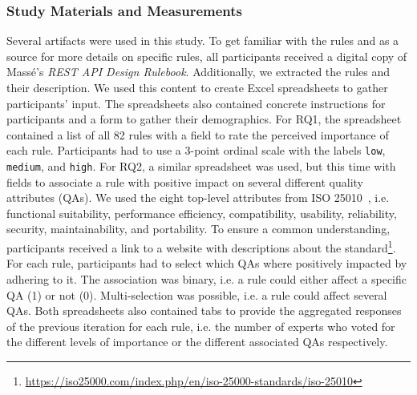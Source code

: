 \documentclass[runningheads]{llncs}
\begin{document}
\subsubsection{Study Materials and Measurements}
Several artifacts were used in this study.
To get familiar with the rules and as a source for more details on specific rules, all participants received a digital copy of Massé's \textit{REST API Design Rulebook}.
Additionally, we extracted the rules and their description.
We used this content to create Excel spreadsheets to gather participants' input.
The spreadsheets also contained concrete instructions for participants and a form to gather their demographics.
For RQ1, the spreadsheet contained a list of all 82 rules with a field to rate the perceived importance of each rule.
Participants had to use a 3-point ordinal scale with the labels \texttt{low}, \texttt{medium}, and \texttt{high}.
For RQ2, a similar spreadsheet was used, but this time with fields to associate a rule with positive impact on several different quality attributes (QAs).
We used the eight top-level attributes from ISO 25010~\cite{ISO25010}, i.e. functional suitability, performance efficiency, compatibility, usability, reliability, security, maintainability, and portability.
To ensure a common understanding, participants received a link to a website with descriptions about the standard\footnote{\url{https://iso25000.com/index.php/en/iso-25000-standards/iso-25010}}.
For each rule, participants had to select which QAs where positively impacted by adhering to it.
The association was binary, i.e. a rule could either affect a specific QA (1) or not (0).
Multi-selection was possible, i.e. a rule could affect several QAs.
Both spreadsheets also contained tabs to provide the aggregated responses of the previous iteration for each rule, i.e. the number of experts who voted for the different levels of importance or the different associated QAs respectively.
\end{document}
